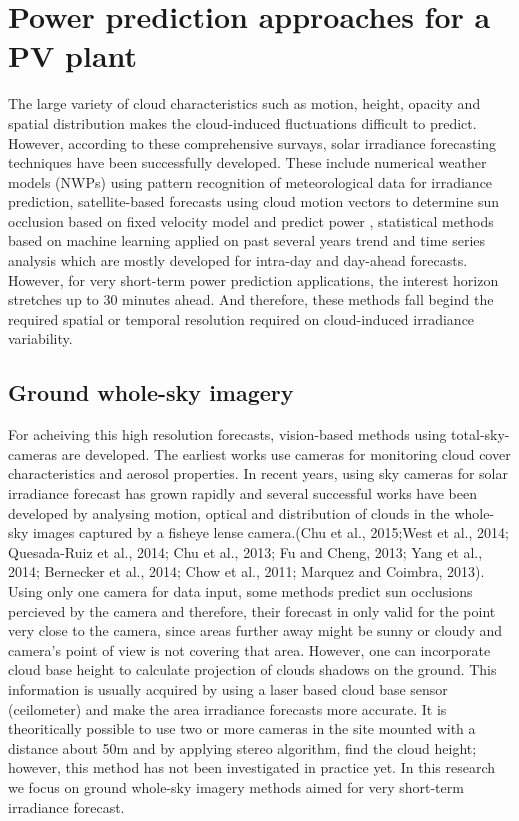 \section{Power prediction approaches for a PV plant}
\label{sec:overview}
The large variety of cloud characteristics such as motion, height, opacity and spatial distribution makes the cloud-induced fluctuations difficult to predict. However, according to these comprehensive survays\cite{survay1, survay2}, solar irradiance forecasting techniques have been successfully developed. 
These include numerical weather models (NWPs)\cite{nwp13} using pattern recognition of meteorological data for irradiance prediction, satellite-based forecasts using cloud motion vectors to determine sun occlusion based on fixed velocity model and predict power \cite{sat_based13,sat_based2004, sat_based99}, statistical methods based on machine learning applied on past several years trend\cite{stat_based13} and time series analysis\cite{time_serise09}
which are mostly developed for intra-day and day-ahead forecasts. However, for very short-term power prediction applications, the interest horizon stretches up to 30 minutes ahead. And therefore, these methods fall begind the required spatial or temporal resolution required on cloud-induced irradiance variability\cite{survay1}.

\subsection{Ground whole-sky imagery}
For acheiving this high resolution forecasts, vision-based methods using total-sky-cameras are developed. The earliest works use cameras for monitoring cloud cover characteristics\cite{cloud_cover03, cloud_cover08} and aerosol properties\cite{areosal1, areosal2}. In recent years,  using sky cameras for solar irradiance forecast has grown rapidly and several successful works have been developed by analysing motion, optical and distribution of clouds in the whole-sky images captured by a fisheye lense camera.(Chu et al., 2015;West et al., 2014; Quesada-Ruiz et al., 2014; Chu et al., 2013; Fu and Cheng, 2013; Yang et al., 2014; Bernecker et al., 2014; Chow et al., 2011; Marquez and Coimbra, 2013).  
Using only one camera for data input, some methods\cite{point_forecast14} predict sun occlusions percieved by the camera and therefore, their forecast in only valid for the point very close to the camera, since areas further away might be sunny or cloudy and camera's point of view is not covering that area. However, one can incorporate cloud base height to calculate projection of clouds shadows on the ground. This information is usually acquired by using a laser based cloud base sensor (ceilometer) and make the area irradiance forecasts  more accurate\cite{cloud_height14}. It is theoritically possible to use two or more cameras in the site mounted with a distance about 50m and by applying stereo algorithm, find the cloud height; however, this method has not been investigated in practice yet. In this research we focus on ground whole-sky imagery methods aimed for very short-term irradiance forecast.

